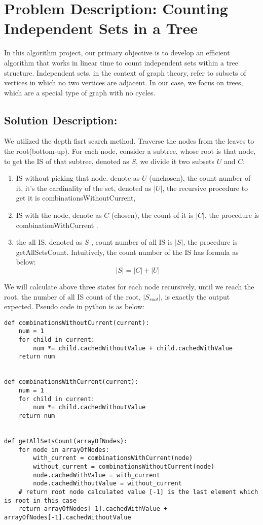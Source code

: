 \documentclass{article}
\begin{document}
\newcommand{\lettercircle}[1]{%
  \begin{tikzpicture}
    \node[circle, draw, minimum size=1cm] at (0,0) {#1};
  \end{tikzpicture}%
}


\section*{Problem Description: Counting Independent Sets in a Tree}
In this algorithm project, our primary objective is to develop an efficient algorithm that works in linear time to count independent sets within a tree structure. Independent sets, in the context of graph theory, refer to subsets of vertices in which no two vertices are adjacent. In our case, we focus on trees, which are a special type of graph with no cycles.

\subsection*{Solution Description:}
We utilized the depth fisrt search method. Traverse the nodes from the leaves to the root(bottom-up).
For each node, consider a subtree, whose root is that node, to get the IS of that subtree, denoted as $S$, we divide it two subsets $U$ and $C$: 
\begin{enumerate}
  \item IS without picking that node. denote as $U$ (unchosen), the count number of it, it's the cardinality of the set, denoted as $|U|$, the recursive procedure to get it is combinationsWithoutCurrent,  
  \item IS with the node, denote as $C$ (chosen), the count of it is $|C|$, the procedure is combinationWithCurrent . 
  \item the all IS,  denoted as $S$ , count number of all IS is $|S|$, the procedure is getAllSetsCount.
  Intuitively, the count number of the IS has formula as below:
    \[ |S| = |C| + |U| \] 
\end{enumerate}
We will calculate above three states for each node recursively, until we reach the root, the number of all IS count of the root,
$|S_{root}|$, is exactly the output expected. Pseudo code in python is as below: 
\newpage
\begin{lstlisting}
def combinationsWithoutCurrent(current):
    num = 1
    for child in current:
        num *= child.cachedWithoutValue + child.cachedWithValue
    return num


def combinationsWithCurrent(current):
    num = 1
    for child in current:
        num *= child.cachedWithoutValue
    return num


def getAllSetsCount(arrayOfNodes):
    for node in arrayOfNodes:
        with_current = combinationsWithCurrent(node)
        without_current = combinationsWithoutCurrent(node)
        node.cachedWithValue = with_current
        node.cachedWithoutValue = without_current
    # return root node calculated value [-1] is the last element which is root in this case
    return arrayOfNodes[-1].cachedWithValue + arrayOfNodes[-1].cachedWithoutValue
\end{lstlisting}
\end{document}
